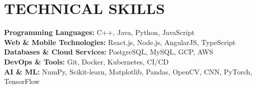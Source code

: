 \documentclass[letterpaper,10pt]{article}
\begin{document}
\section*{\large TECHNICAL SKILLS}
\textbf{Programming Languages:} C++, Java, Python, JavaScript \\
\textbf{Web \& Mobile Technologies:} React.js, Node.js, AngularJS, TypeScript \\
\textbf{Databases \& Cloud Services:} PostgreSQL, MySQL, GCP, AWS \\
\textbf{DevOps \& Tools:} Git, Docker, Kubernetes, CI/CD \\
\textbf{AI \& ML:} NumPy, Scikit-learn, Matplotlib, Pandas, OpenCV, CNN, PyTorch, TensorFlow
\end{document}
